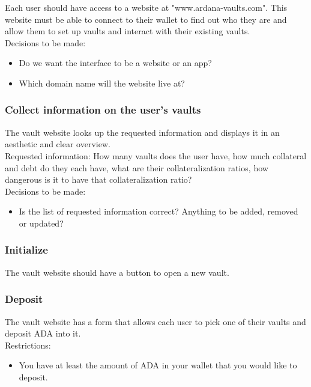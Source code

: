 \documentclass{article} %
\begin{document}
Each user should have access to a website at "www.ardana-vaults.com". This
website must be able to connect to their wallet to find out who they are and
allow them to set up vaults and interact with their existing vaults. \\

Decisions to be made:
\begin{itemize}
  \item Do we want the interface to be a website or an app?
  \item Which domain name will the website live at?
\end{itemize}

\subsubsection{Collect information on the user's vaults}

The vault website looks up the requested information and displays it in an
aesthetic and clear overview. \\

Requested information: How many vaults does the user have, how much collateral
and debt do they each have, what are their collateralization ratios, how
dangerous is it to have that collateralization ratio? \\

Decisions to be made:
\begin{itemize}
  \item Is the list of requested information correct? Anything to be added,
    removed or updated?
\end{itemize}

\subsubsection{Initialize}

The vault website should have a button to open a new vault.

\subsubsection{Deposit}

The vault website has a form that allows each user to pick one of their vaults
and deposit ADA into it. \\

Restrictions:
\begin{itemize}
  \item You have at least the amount of ADA in your wallet that you would like
    to deposit.
\end{itemize}
\end{document}
